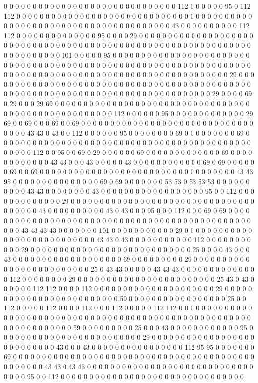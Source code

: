 0 0 0 0 0 0 0 0 0 0 0 0 0 0 0 0 0 0 0 0 0 0 0 0 0 0 0 0 0 0 112 0 0 0 0 0 0 95 0 112 112 0 0 0 0 0 0 0 0 0 0 0 0 0 0 0 0 0 0 0 0 0 0 0 0 0 0 0 0 0 0 0 0 0 0 0 0 0 0 0 0 0 0 0 0 0 0 0 0 0 0 0 0 0 0 0 0 0 0 0 0 0 0 0 0 0 0 0 0 0 0 43 0 0 0 0 0 0 0 0 0 0 112 112 0 0 0 0 0 0 0 0 0 0 0 0 0 0 95 0 0 0 0 29 0 0 0 0 0 0 0 0 0 0 0 0 0 0 0 0 0 0 0 0 0 0 0 0 0 0 0 0 0 0 0 0 0 0 0 0 0 0 0 0 0 0 0 0 0 0 0 0 0 0 0 0 0 0 0 0 0 0 0 0 0 0 0 0 0 0 0 0 0 0 0 0 0 101 0 0 0 0 0 95 0 0 0 0 0 0 0 0 0 0 0 0 0 0 0 0 0 0 0 0 0 0 0 0 0 0 0 0 0 0 0 0 0 0 0 0 0 0 0 0 0 0 0 0 0 0 0 0 0 0 0 0 0 0 0 0 0 0 0 0 0 0 0 0 0 0 0 0 0 0 0 0 0 0 0 0 0 0 0 0 0 0 0 0 0 0 0 0 0 0 0 0 0 0 0 0 0 0 0 0 0 0 0 0 0 0 29 0 0 0 0 0 0 0 0 0 0 0 0 0 0 0 0 0 0 0 0 0 0 0 0 0 0 0 0 0 0 0 0 0 0 0 0 0 0 0 0 0 0 0 0 0 0 0 0 0 0 0 0 0 0 0 0 0 0 0 0 0 0 0 0 0 0 0 0 0 0 0 0 0 0 0 0 0 0 0 0 0 0 29 0 0 0 0 69 0 29 0 0 0 29 69 0 0 0 0 0 0 0 0 0 0 0 0 0 0 0 0 0 0 0 0 0 0 0 0 0 0 0 0 0 0 0 0 0 0 0 0 0 0 0 0 0 0 0 0 0 0 0 0 0 0 0 0 0 112 0 0 0 0 0 0 95 0 0 0 0 0 0 0 0 0 0 0 0 0 29 69 0 0 69 0 0 0 69 0 0 69 0 0 0 0 0 0 0 0 0 0 0 0 0 0 0 0 0 0 0 0 0 0 0 0 0 0 0 0 0 0 0 0 0 0 43 43 0 43 0 0 112 0 0 0 0 0 0 95 0 0 0 0 0 0 0 0 69 0 0 0 0 0 0 0 0 0 69 0 0 0 0 0 0 0 0 0 0 0 0 0 0 0 0 0 0 0 0 0 0 0 0 0 0 0 0 0 0 0 0 0 0 0 0 0 0 0 0 0 0 0 0 0 0 0 0 0 112 0 0 95 0 0 69 0 29 0 0 0 0 0 0 69 0 0 0 0 0 0 0 0 0 0 0 0 0 69 0 0 0 0 0 0 0 0 0 0 0 0 43 43 0 0 0 43 0 0 0 0 0 43 0 0 0 0 0 0 0 0 0 0 0 0 69 0 69 0 0 0 0 0 0 69 0 0 69 0 0 0 0 0 0 0 0 0 0 0 0 0 0 0 0 0 0 0 0 0 0 0 0 0 0 0 0 0 0 0 0 0 0 43 43 95 0 0 0 0 0 0 0 0 0 0 0 0 0 0 0 69 0 69 0 0 0 0 0 0 0 53 53 0 53 53 53 0 0 0 0 0 0 0 0 0 0 43 43 0 0 0 0 0 0 0 0 43 0 0 0 0 0 0 0 0 0 0 0 0 0 0 0 0 0 0 95 0 0 112 0 0 0 0 0 0 0 0 0 0 0 0 0 29 0 0 0 0 0 0 0 0 0 0 0 0 0 0 0 0 0 0 0 0 0 0 0 0 0 0 0 0 0 0 0 0 0 0 0 0 0 0 43 0 0 0 0 0 0 0 0 0 0 43 0 43 0 0 0 95 0 0 0 112 0 0 0 69 0 69 0 0 0 0 0 0 0 0 0 0 0 0 0 0 0 0 0 0 0 0 0 0 0 0 0 0 0 0 0 0 0 0 0 0 0 0 0 0 0 0 0 0 0 0 0 0 0 0 0 0 43 43 43 43 0 0 0 0 0 0 0 101 0 0 0 0 0 0 0 0 0 0 0 29 0 0 0 0 0 0 0 0 0 0 0 0 0 0 0 0 0 0 0 0 0 0 0 0 0 0 0 0 43 43 0 43 0 0 0 0 0 0 0 0 0 0 0 112 0 0 0 0 0 0 0 0 0 0 0 29 0 0 0 0 0 0 0 0 0 0 0 0 0 0 0 0 0 0 0 0 0 0 0 0 0 0 0 0 25 0 0 0 0 43 0 0 0 43 0 0 0 0 0 0 0 0 0 0 0 0 0 0 0 0 0 0 0 69 0 0 0 0 0 0 0 0 0 29 0 0 0 0 0 0 0 0 0 0 0 0 0 0 0 0 0 0 0 0 0 0 0 0 0 25 0 43 43 0 0 0 0 0 43 43 43 0 0 0 0 0 0 0 0 0 0 0 0 0 0 112 0 0 0 0 0 0 0 0 29 0 0 0 0 0 0 0 0 0 0 0 0 0 0 0 0 0 0 0 0 0 0 0 0 25 43 0 43 0 0 0 0 0 0 112 112 0 0 0 0 112 0 0 0 0 0 0 0 0 0 0 0 0 0 0 0 0 0 0 0 0 0 29 0 0 0 0 0 0 0 0 0 0 0 0 0 0 0 0 0 0 0 0 0 0 0 0 0 59 0 0 0 0 0 0 0 0 0 0 0 0 0 0 0 0 0 25 0 0 112 0 0 0 0 0 112 0 0 0 0 112 0 0 0 112 0 0 0 0 0 112 112 0 0 0 0 0 0 0 0 0 0 0 0 0 0 0 0 0 0 0 0 0 0 0 0 0 0 0 0 0 0 0 0 0 0 0 0 0 0 0 0 0 0 0 0 0 0 0 0 0 0 0 0 0 0 0 0 0 0 0 0 0 0 0 0 0 0 0 0 59 0 0 0 0 0 0 0 0 0 25 0 0 0 43 0 0 0 0 0 0 0 0 0 0 0 0 95 0 0 0 0 0 0 0 0 0 0 0 0 0 0 0 0 0 0 0 0 0 0 0 0 0 29 0 0 0 0 0 0 0 0 0 0 0 0 0 0 0 0 0 0 0 0 0 0 0 0 0 0 0 43 0 0 0 43 0 0 0 0 0 0 0 0 0 0 0 0 0 0 0 0 112 95 95 0 0 0 0 0 0 0 69 0 0 0 0 0 0 0 0 0 0 0 0 0 0 0 0 0 0 0 0 0 0 0 0 0 0 0 0 0 0 0 0 0 0 0 0 0 0 0 0 0 0 0 0 0 0 0 0 0 43 43 0 43 43 0 0 0 0 0 0 0 0 0 0 0 0 0 0 0 0 0 0 0 0 0 0 0 0 0 0 0 0 0 0 0 0 0 95 0 0 112 0 0 0 0 0 0 0 0 0 0 0 0 0 0 0 0 0 0 0 0 0 0 0 0 0 0 0 0 0 0 0 0 